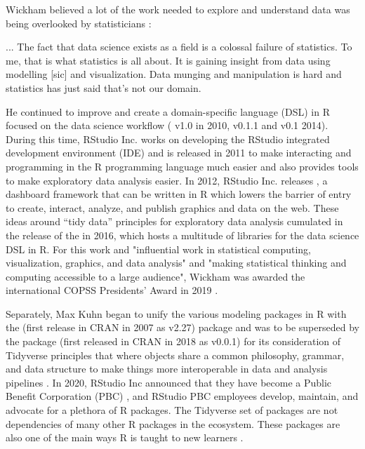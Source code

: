 \documentclass[010-intro.tex]{subfiles}
\begin{document}
        Wickham believed a lot of the work needed to explore and understand data was being overlooked by statisticians
        \cite{smithHadleyWickhamWhy2015}:
        \begin{displayquote}
            ... The fact that data science exists as a field is a colossal failure of statistics.
            To me, that is what statistics is all about.
            It is gaining insight from data using modelling [sic] and visualization.
            Data munging and manipulation is hard and statistics has just said that's not our domain.
        \end{displayquote}
        He continued to improve and create a domain-specific language (DSL) in R focused on the data science workflow
        ( v1.0 in 2010,  v0.1.1 and  v0.1 2014).
        During this time,
        RStudio Inc. works on developing the RStudio integrated development environment (IDE)
        and is released in 2011 to make interacting and programming
        in the R programming language much easier and also provides tools to make exploratory data analysis easier.
        In 2012, RStudio Inc. releases ,
        a dashboard framework that can be written in R which
        lowers the barrier of entry to create, interact, analyze, and publish graphics and data on the web.
        These ideas around ``tidy data'' principles for exploratory data analysis
        \cite{wickhamTidyData2014}
        cumulated in the release of the  in 2016,
        which hosts a multitude of libraries for the data science DSL in R.
        For this work and "influential work in statistical computing, visualization, graphics, and data analysis" and
        "making statistical thinking and computing accessible to a large audience",
        Wickham was awarded the international COPSS Presidents' Award in 2019
        \cite{InstituteMathematicalStatistics2019}.

        Separately,
        Max Kuhn began to unify the various modeling packages in R with the 
        (first release in CRAN in 2007 as v2.27) package
        and was to be superseded by
        the  package
        (first released in CRAN in 2018 as v0.0.1)
        for its consideration of Tidyverse principles that where objects share a common philosophy, grammar, and data structure
        to make things more interoperable in data and analysis pipelines
        \cite{wickhamR4ds, kuhnTidyModeling2021}.
        In 2020, RStudio Inc announced that they have become a Public Benefit Corporation (PBC)
        \cite{allaireRStudioPBC2020, rstudioRStudio},
        and RStudio PBC employees develop, maintain, and advocate for a plethora of R packages.
        The Tidyverse set of packages are not dependencies of many other R packages in the ecosystem.
        These packages are also one of the main ways R is taught to new learners
        \cite{wickhamR4ds}.
\end{document}
